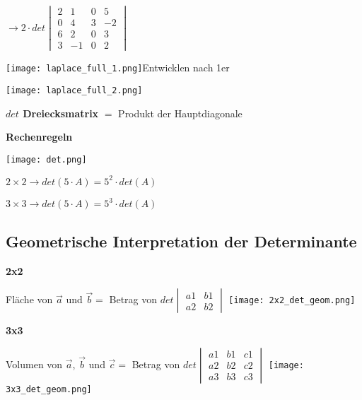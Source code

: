 \begin{multicols*}{3}
{\begin{multicols}{2}
            {  $ \rightarrow  2 \cdot det \begin{vmatrix} 2 & 1 & 0 & 5 \\ 0 & 4 & 3 & -2 \\ 6 & 2 &0 & 3 \\ 3 & -1 &0 & 2 \end{vmatrix} $}
        \end{multicols}}

    {\texttt{[image: laplace\_full\_1.png]}Entwicklen nach 1er}

    {\texttt{[image: laplace\_full\_2.png]}}


    \textbf{$det$ Dreiecksmatrix}
    $ = $ Produkt der Hauptdiagonale
    \WhiteSpace

    \textbf{Rechenregeln}

    {\texttt{[image: det.png]}}

    $2\times 2 \rightarrow det(5 \cdot A) = 5^2 \cdot det(A)$

    $3\times 3 \rightarrow det(5 \cdot A) = 5^3 \cdot det(A)$

    \WhiteSpace
    \subsection{Geometrische Interpretation der Determinante }
    {\textbf{2x2}}

    {Fläche von $\vec{a} $ und $ \vec{b} = $ Betrag von $ det \begin{vmatrix} a1 & b1  \\ a2 & b2 \end{vmatrix} $}
    {\texttt{[image: 2x2\_det\_geom.png]}}




    \textbf{3x3}

    {Volumen von $\vec{a} $, $ \vec{b}$ und $\vec{c} = $ Betrag von $   det \begin{vmatrix} a1 & b1 & c1 \\ a2 & b2 & c2 \\ a3 & b3 & c3  \end{vmatrix}  $}
    {\texttt{[image: 3x3\_det\_geom.png]}}
    \mbox{}

\end{multicols*}


